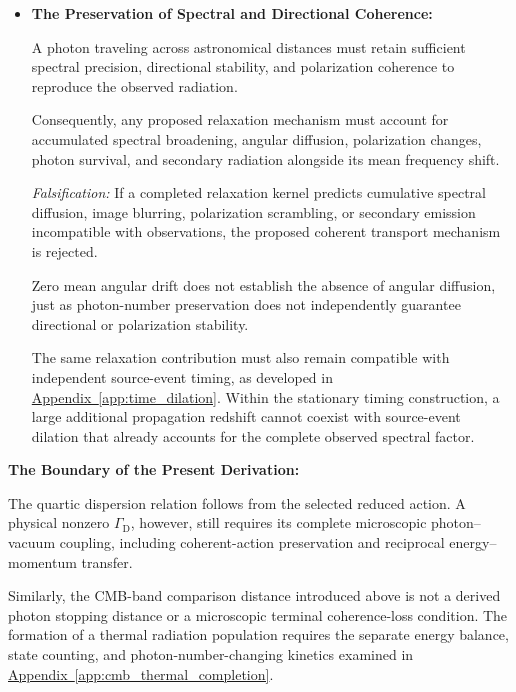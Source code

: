 \begin{itemize}
\textit{Falsification:} A completed microscopic
photon--vacuum interaction must generate the coherent
frequency change, spatial ray propagation, and reciprocal
energy--momentum transfer through one consistent
mechanical response. A verified contradiction among
these requirements would falsify that implementation.
An incompatible measured loss response would likewise
reject the specified stress--strain relaxation closure.

\item \textbf{The Preservation of Spectral and Directional Coherence:}

A photon traveling across astronomical distances must
retain sufficient spectral precision, directional
stability, and polarization coherence to reproduce
the observed radiation.

Consequently, any proposed relaxation mechanism must
account for accumulated spectral broadening, angular
diffusion, polarization changes, photon survival,
and secondary radiation alongside its mean frequency
shift.

\textit{Falsification:} If a completed relaxation
kernel predicts cumulative spectral diffusion,
image blurring, polarization scrambling, or secondary
emission incompatible with observations, the proposed
coherent transport mechanism is rejected.

Zero mean angular drift does not establish the
absence of angular diffusion, just as photon-number
preservation does not independently guarantee
directional or polarization stability.

The same relaxation contribution must also remain
compatible with independent source-event timing,
as developed in
\hyperref[app:time_dilation]{Appendix~\ref*{app:time_dilation}}.
Within the stationary timing construction, a large
additional propagation redshift cannot coexist with
source-event dilation that already accounts for
the complete observed spectral factor.

\end{itemize}

\noindent\textbf{The Boundary of the Present Derivation:}

The quartic dispersion relation follows from the
selected reduced action. A physical nonzero
$\Gamma_{\mathrm D}$, however, still requires its
complete microscopic photon--vacuum coupling,
including coherent-action preservation and
reciprocal energy--momentum transfer.

Similarly, the CMB-band comparison distance
introduced above is not a derived photon stopping
distance or a microscopic terminal coherence-loss
condition. The formation of a thermal radiation
population requires the separate energy balance,
state counting, and photon-number-changing kinetics
examined in
\hyperref[app:cmb_thermal_completion]{Appendix~\ref*{app:cmb_thermal_completion}}.

